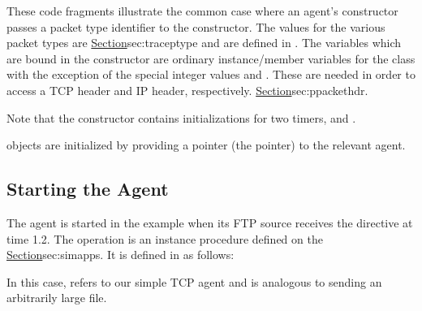 These code fragments illustrate the common case where an agent's
constructor passes a packet type identifier to the 
constructor.
The values for the various packet types are
\href{used by the packet tracing facility}{Section}{sec:traceptype}
and are defined in .
The variables which are bound in the  constructor
are ordinary instance/member variables for the class
with the exception of the special integer values 
and .
These are needed in order to access a TCP header and IP header, respectively.
\href{Additional details are in the section on packet headers}{Section}{sec:ppackethdr}.

Note that the  constructor contains initializations for
two timers,  and .

objects are initialized by providing a pointer (the  pointer) to
the relevant agent.

\subsection{Starting the Agent}
\label{sec:starttcp}

The  agent is started in the example when its
FTP source receives the  directive at time 1.2.
The  operation is an instance procedure defined on the
\href{class Application/FTP}{Section}{sec:simapps}.
It is defined in  as follows:
In this case,  refers to our simple TCP agent and
 is analogous to sending an arbitrarily large file.


